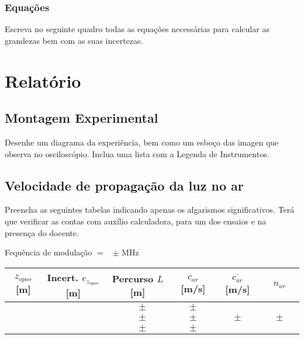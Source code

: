 \documentclass[a4paper,12pt]{article}  %
\begin{document}
\subsubsection{\sf Equações }
Escreva no seguinte quadro todas as equações necessárias para calcular as grandezas bem com as suas incertezas.
\begin{center}
\framebox[15cm]{\rule{0pt}{6.5cm}}
\end{center}


\section{\sf Relatório}
\subsection{\sf Montagem Experimental}
Desenhe um diagrama da experiência, bem como um esboço das imagen que observa no osciloscópio. Inclua uma lista com a Legenda de Instrumentos.

\begin{center}
\framebox[18cm]{\rule{0pt}{6.5cm}}
\end{center}

\subsection{\sf Velocidade de propagação da luz no ar}%
Preencha as seguintes tabelas indicando  apenas os algarismos significativos. 
Terá que verificar as contas com auxílio calculadora, para um dos ensaios e na presença do docente.


\noindent  Fequência de modulação $=$~\underline{\makebox[1cm][r]{~}} $\pm$ \underline{\makebox[1cm][r]{~}} MHz %

\begin{center}
	\begin{tabular}{|c|c|c|c|c|c|}
	\hline
	 $z_{opos}$  [m]   &  Incert. $e_{z_{opos}}$  [m] & Percurso $L$ [m] & $c_{ar}$  [m/s]& $\overline{c_{ar}}$ [m/s]	& $n_{ar}$ \\
	\hline \hline
	  &  & $ \quad \pm $ & $ \quad \pm \quad $ &  & \\ \cline{1-4}
	  &  & $ \quad \pm $ & $ \quad \pm \quad$ & $ \quad \pm \quad$  & $ \quad \pm \quad$ \\ \cline{1-4}
	  &  & $ \quad \pm $ & $ \quad \pm \quad $ &  & \\ \hline
			\end{tabular}
\end{center}
\end{document}
